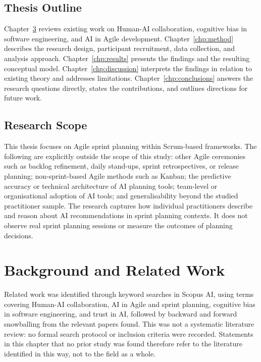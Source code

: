 \documentclass[a4paper,twoside]{bth}
\begin{document}
\section{Thesis Outline}

Chapter~\ref{chp:relatedwork} reviews existing work on Human-AI collaboration, cognitive bias in software engineering, and AI in Agile development. Chapter~\ref{chp:method} describes the research design, participant recruitment, data collection, and analysis approach. Chapter~\ref{chp:results} presents the findings and the resulting conceptual model. Chapter~\ref{chp:discussion} interprets the findings in relation to existing theory and addresses limitations. Chapter~\ref{chp:conclusions} answers the research questions directly, states the contributions, and outlines directions for future work.

\section{Research Scope}

This thesis focuses on Agile sprint planning within Scrum-based frameworks. The following are explicitly outside the scope of this study: other Agile ceremonies such as backlog refinement, daily stand-ups, sprint retrospectives, or release planning; non-sprint-based Agile methods such as Kanban; the predictive accuracy or technical architecture of AI planning tools; team-level or organisational adoption of AI tools; and generalisability beyond the studied practitioner sample. The research captures how individual practitioners describe and reason about AI recommendations in sprint planning contexts. It does not observe real sprint planning sessions or measure the outcomes of planning decisions.

\chapter{Background and Related Work}
\label{chp:relatedwork}

Related work was identified through keyword searches in Scopus AI, using terms covering Human-AI collaboration, AI in Agile and sprint planning, cognitive bias in software engineering, and trust in AI, followed by backward and forward snowballing from the relevant papers found. This was not a systematic literature review: no formal search protocol or inclusion criteria were recorded. Statements in this chapter that no prior study was found therefore refer to the literature identified in this way, not to the field as a whole.
\end{document}
